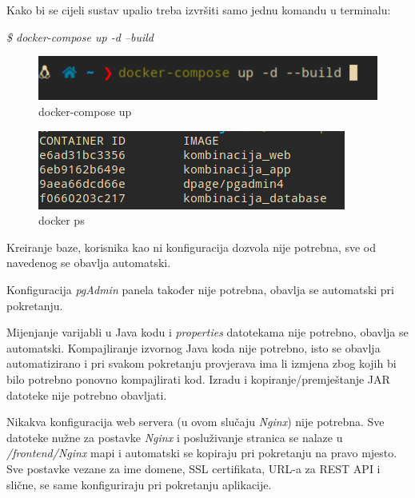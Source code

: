 		Kako bi se cijeli sustav upalio treba izvršiti samo jednu komandu u terminalu:
		
		 \textit{\$ docker-compose up -d --build}
		
		\begin{figure}[H]
					\includegraphics[scale=0.5]{figures/terminl_1.PNG}
					\centering
					\caption{docker-compose up}
					\label{fig:sekv-uc13}
				\end{figure}
				
		\begin{figure}[H]
					\includegraphics[scale=1]{figures/2-ps.PNG}
					\centering
					\caption{docker ps}
					\label{fig:sekv-uc13}
				\end{figure}
						
		\begin{packed_item}
			\item Kreiranje baze, korisnika kao ni konfiguracija dozvola nije potrebna, sve od navedenog se obavlja automatski. 

			\item Konfiguracija  \textit{pgAdmin} panela također nije potrebna, obavlja se automatski pri pokretanju. 
			\item Mijenjanje varijabli u Java kodu i \textit{properties} datotekama nije potrebno, obavlja se automatski. Kompajliranje izvornog Java koda nije potrebno, isto se obavlja automatizirano i pri svakom pokretanju provjerava ima li izmjena zbog kojih bi bilo potrebno ponovno kompajlirati kod. Izradu i kopiranje/premještanje JAR datoteke nije potrebno obavljati.

			\item Nikakva konfiguracija web servera (u ovom slučaju \textit{Nginx}) nije potrebna. Sve datoteke nužne za postavke \textit{Nginx} i posluživanje stranica se nalaze u \textit{/frontend/Nginx} mapi i automatski se kopiraju pri pokretanju na pravo mjesto. Sve postavke vezane za ime domene, SSL certifikata, URL-a za REST API i slične, se same konfiguriraju pri pokretanju aplikacije.			
			\end{packed_item}		
				
